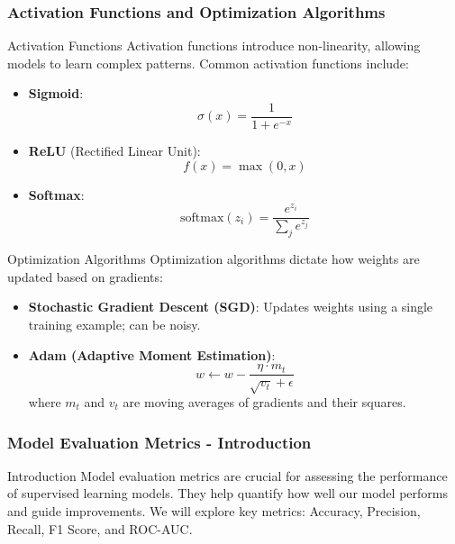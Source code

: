 \documentclass[aspectratio=169]{beamer}
\begin{document}
\begin{frame}[fragile]
    \frametitle{Activation Functions and Optimization Algorithms}
    \begin{block}{Activation Functions}
        Activation functions introduce non-linearity, allowing models to learn complex patterns. Common activation functions include:
        \begin{itemize}
            \item \textbf{Sigmoid}: 
            \begin{equation}
                \sigma(x) = \frac{1}{1 + e^{-x}}
            \end{equation}
            \item \textbf{ReLU} (Rectified Linear Unit):
            \begin{equation}
                f(x) = \max(0, x)
            \end{equation}
            \item \textbf{Softmax}:
            \begin{equation}
                \text{softmax}(z_i) = \frac{e^{z_i}}{\sum_{j} e^{z_j}}
            \end{equation}
        \end{itemize}
    \end{block}

    \begin{block}{Optimization Algorithms}
        Optimization algorithms dictate how weights are updated based on gradients:
        \begin{itemize}
            \item \textbf{Stochastic Gradient Descent (SGD)}: Updates weights using a single training example; can be noisy.
            \item \textbf{Adam (Adaptive Moment Estimation)}: 
            \begin{equation}
                w \leftarrow w - \frac{\eta \cdot m_t}{\sqrt{v_t} + \epsilon}
            \end{equation}
            where \(m_t\) and \(v_t\) are moving averages of gradients and their squares.
        \end{itemize}
    \end{block}
\end{frame}

\begin{frame}[fragile]
    \frametitle{Model Evaluation Metrics - Introduction}
    \begin{block}{Introduction}
        Model evaluation metrics are crucial for assessing the performance of supervised learning models. They help quantify how well our model performs and guide improvements. 
        We will explore key metrics: Accuracy, Precision, Recall, F1 Score, and ROC-AUC.
    \end{block}
\end{frame}
\end{document}

